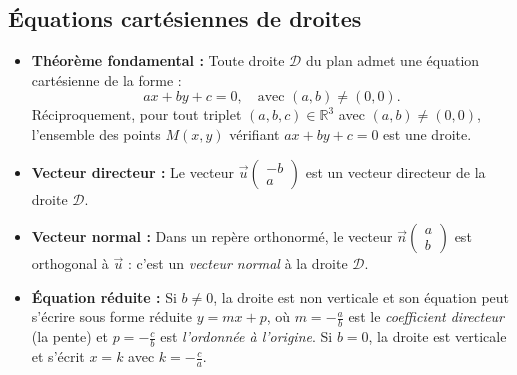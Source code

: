 \documentclass[11pt,a4paper]{article}
\newcommand{\R}{\mathbb{R}}
\begin{document}
\subsection{Équations cartésiennes de droites}
\begin{itemize}[leftmargin=1.5cm]
    \item \textbf{Théorème fondamental :} Toute droite $\mathscr{D}$ du plan admet une équation cartésienne de la forme :
    \[
    a x + b y + c = 0, \quad \text{avec } (a, b) \neq (0, 0).
    \]
    Réciproquement, pour tout triplet $(a, b, c) \in \R^3$ avec $(a, b) \neq (0, 0)$, l'ensemble des points $M(x, y)$ vérifiant $ax + by + c = 0$ est une droite.
    \item \textbf{Vecteur directeur :} Le vecteur $\vec{u}\begin{pmatrix} -b \\ a \end{pmatrix}$ est un vecteur directeur de la droite $\mathscr{D}$.
    \item \textbf{Vecteur normal :} Dans un repère orthonormé, le vecteur $\vec{n}\begin{pmatrix} a \\ b \end{pmatrix}$ est orthogonal à $\vec{u}$ : c'est un \emph{vecteur normal} à la droite $\mathscr{D}$.
    \item \textbf{Équation réduite :} Si $b \neq 0$, la droite est non verticale et son équation peut s'écrire sous forme réduite $y = m x + p$, où $m = -\frac{a}{b}$ est le \emph{coefficient directeur} (la pente) et $p = -\frac{c}{b}$ est \emph{l'ordonnée à l'origine}. Si $b = 0$, la droite est verticale et s'écrit $x = k$ avec $k = -\frac{c}{a}$.
\end{itemize}
\end{document}
